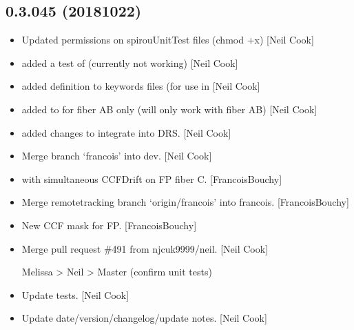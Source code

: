 \documentclass[a4paper,10pt,english]{report}
\begin{document}
\subsection{0.3.045 (2018\sphinxhyphen{}10\sphinxhyphen{}22)}
\label{\detokenize{misc/changelog:id305}}\begin{itemize}
\item {} 
Updated permissions on spirouUnitTest files (chmod +x) {[}Neil Cook{]}

\item {} 
 \sphinxhyphen{} added a test of  (currently
not working) {[}Neil Cook{]}

\item {} 
 \sphinxhyphen{} added  definition to keywords files
(for use in  {[}Neil Cook{]}

\item {} 
 \sphinxhyphen{} added  to  \sphinxhyphen{}
for fiber AB only (will only work with fiber AB) {[}Neil Cook{]}

\item {} 
 \sphinxhyphen{} added changes to integrate into DRS. {[}Neil
Cook{]}

\item {} 
Merge branch ‘francois’ into dev. {[}Neil Cook{]}

\item {} 
 with simultaneous CCFDrift on FP fiber C.
{[}FrancoisBouchy{]}

\item {} 
Merge remote\sphinxhyphen{}tracking branch ‘origin/francois’ into francois.
{[}FrancoisBouchy{]}

\item {} 
New CCF mask for FP. {[}FrancoisBouchy{]}

\item {} 
Merge pull request \#491 from njcuk9999/neil. {[}Neil Cook{]}

Melissa \textendash{}\textgreater{} Neil \textendash{}\textgreater{} Master (confirm unit tests)

\item {} 
Update tests. {[}Neil Cook{]}

\item {} 
Update date/version/changelog/update notes. {[}Neil Cook{]}

\end{itemize}
\end{document}
